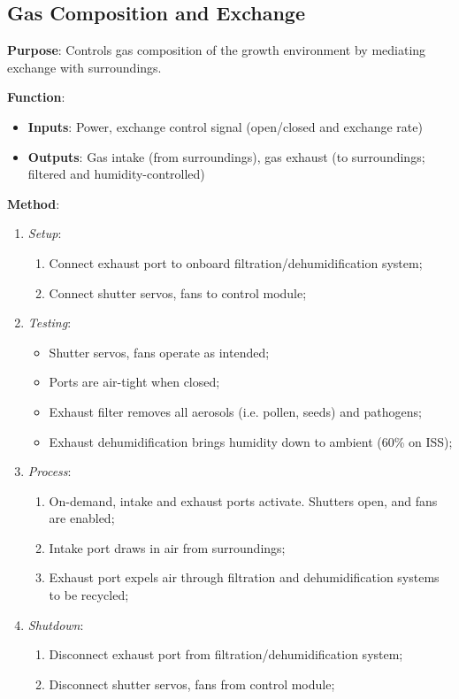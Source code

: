 \subsection{Gas Composition and Exchange}
\label{sec:gas}

\textbf{Purpose}: Controls gas composition of the growth environment by mediating exchange with surroundings.

\textbf{Function}:
\begin{itemize}
    \item \textbf{Inputs}: Power, exchange control signal (open/closed and exchange rate)
    \item \textbf{Outputs}: Gas intake (from surroundings), gas exhaust (to surroundings; filtered and humidity-controlled)
\end{itemize}

\textbf{Method}:
\begin{enumerate}
    \item \textit{Setup}:
    \begin{enumerate}
        \item Connect exhaust port to onboard filtration/dehumidification system;
        \item Connect shutter servos, fans to control module;
    \end{enumerate}
    \item \textit{Testing}:
    \begin{itemize}
        \item Shutter servos, fans operate as intended;
        \item Ports are air-tight when closed;
        \item Exhaust filter removes all aerosols (i.e. pollen, seeds) and pathogens;
        \item Exhaust dehumidification brings humidity down to ambient (60\% on ISS); %
    \end{itemize}
    \item \textit{Process}:
    \begin{enumerate}
        \item On-demand, intake and exhaust ports activate. Shutters open, and fans are enabled;
        \item Intake port draws in air from surroundings;
        \item Exhaust port expels air through filtration and dehumidification systems to be recycled;
    \end{enumerate}
    \item \textit{Shutdown}:
    \begin{enumerate}
        \item Disconnect exhaust port from filtration/dehumidification system;
        \item Disconnect shutter servos, fans from control module;
    \end{enumerate}
\end{enumerate}

